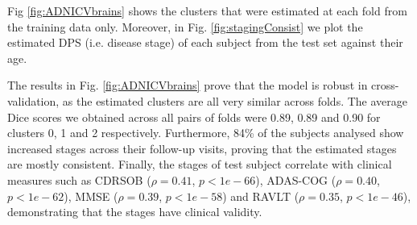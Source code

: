\documentclass{llncs}
\begin{document}
Fig \ref{fig:ADNICVbrains} shows the clusters that were estimated at each fold from the training data only. Moreover, in Fig. \ref{fig:stagingConsist} we plot the estimated DPS (i.e. disease stage) of each subject from the test set against their age.

The results in Fig. \ref{fig:ADNICVbrains} prove that the model is robust in cross-validation, as the estimated clusters are all very similar across folds. The average Dice scores we obtained across all pairs of folds were 0.89, 0.89 and 0.90 for clusters 0, 1 and 2 respectively. Furthermore, 84\% of the subjects analysed show increased stages across their follow-up visits, proving that the estimated stages are mostly consistent. Finally, the stages of test subject correlate with clinical measures such as CDRSOB ($\rho = 0.41$, $p < 1e-66$), ADAS-COG ($\rho = 0.40$, $p < 1e-62$), MMSE ($\rho = 0.39$, $p < 1e-58$) and RAVLT ($\rho = 0.35$, $p < 1e-46$), demonstrating that the stages have clinical validity.

\newcommand{\outFoldADNICVbrains}{figures/crossvalid/adniThavgFWHM0Initk-meansCl3Pr0Ra1_VWDPMMean}

\newcommand{\trimModelValidTop}{150}
\end{document}
